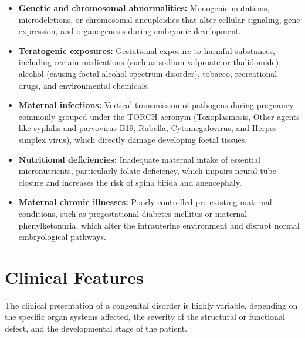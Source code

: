 \begin{itemize}
    \item \textbf{Genetic and chromosomal abnormalities:} Monogenic mutations, microdeletions, or chromosomal aneuploidies that alter cellular signaling, gene expression, and organogenesis during embryonic development.
    \item \textbf{Teratogenic exposures:} Gestational exposure to harmful substances, including certain medications (such as sodium valproate or thalidomide), alcohol (causing foetal alcohol spectrum disorder), tobacco, recreational drugs, and environmental chemicals.
    \item \textbf{Maternal infections:} Vertical transmission of pathogens during pregnancy, commonly grouped under the TORCH acronym (Toxoplasmosis, Other agents like syphilis and parvovirus B19, Rubella, Cytomegalovirus, and Herpes simplex virus), which directly damage developing foetal tissues.
    \item \textbf{Nutritional deficiencies:} Inadequate maternal intake of essential micronutrients, particularly folate deficiency, which impairs neural tube closure and increases the risk of spina bifida and anencephaly.
    \item \textbf{Maternal chronic illnesses:} Poorly controlled pre-existing maternal conditions, such as pregestational diabetes mellitus or maternal phenylketonuria, which alter the intrauterine environment and disrupt normal embryological pathways.
\end{itemize}

\section*{Clinical Features}
The clinical presentation of a congenital disorder is highly variable, depending on the specific organ systems affected, the severity of the structural or functional defect, and the developmental stage of the patient.

